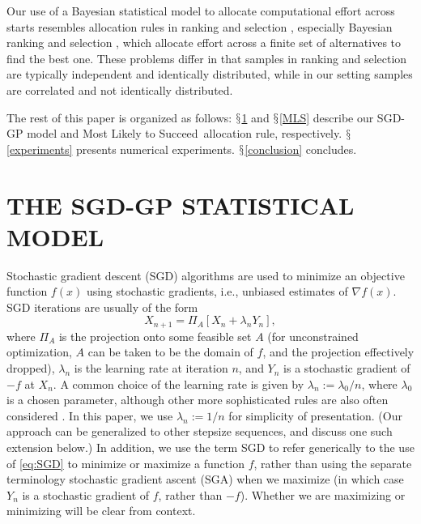 \documentclass[12pt,english]{article}
\newcommand{\name}{Most Likely to Succeed}
\begin{document}
Our use of a Bayesian statistical model to allocate computational effort across starts resembles allocation rules in ranking and selection \citep{Bechhofer:1995,kim:2007,kim:20062}, especially Bayesian ranking and selection \citep{frazier2009knowledge}, which allocate effort across a finite set of alternatives to find the best one.  These problems differ in that samples in ranking and selection are typically independent and identically distributed, while in our setting samples are correlated and not identically distributed.

The rest of this paper is organized as follows: $\mathsection$\ref{statistical_model} and $\mathsection$\ref{MLS} describe our SGD-GP model and \name\ allocation rule, respectively. $\mathsection$\ref{experiments} presents numerical experiments. $\mathsection$\ref{conclusion} concludes.

\section{THE SGD-GP STATISTICAL MODEL}
\label{statistical_model}

Stochastic gradient descent (SGD) algorithms are used to minimize an objective function $f(x)$ using stochastic gradients, i.e., unbiased estimates of $\nabla f(x)$. SGD iterations are usually of the form
\begin{equation}
X_{n+1}=\Pi_{A}\left[X_{n}+\lambda_{n}Y_{n}\right],\label{eq:SGD}
\end{equation}
where $\Pi_{A}$ is the projection onto some feasible set $A$ (for unconstrained optimization, $A$ can be taken to be the domain of $f$, and the projection effectively dropped),
$\lambda_{n}$ is the learning rate at iteration $n$, and $Y_{n}$ is a stochastic gradient of $-f$ at $X_{n}$.  A common choice of the learning rate is given by $\lambda_{n}:=\lambda_{0}/n$, where $\lambda_{0}$ is a chosen parameter, although other more sophisticated rules are also often considered \citep{powell2007approximate}. In this paper, we use  $\lambda_{n}:=1/n$ for simplicity of presentation. (Our approach can be generalized to other stepsize sequences, and discuss one such extension below.)  In addition, we use the term SGD to refer generically to the use of \eqref{eq:SGD} to minimize or maximize a function $f$, rather than using the separate terminology stochastic gradient ascent (SGA) when we maximize (in which case $Y_n$ is a stochastic gradient of $f$, rather than $-f$).  Whether we are maximizing or minimizing will be clear from context.
\end{document}
